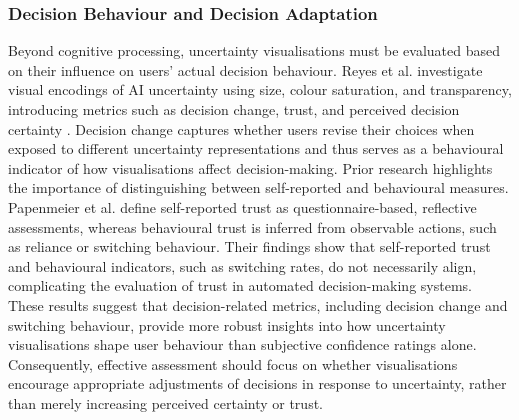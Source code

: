 \documentclass[final,journal,a4paper]{IEEEtran}
\begin{document}
\subsubsection{Decision Behaviour and Decision Adaptation}
Beyond cognitive processing, uncertainty visualisations must be evaluated based on their influence on users’ actual decision behaviour. Reyes et al. \cite{Reyes2025} investigate visual encodings of AI uncertainty using size, colour saturation, and transparency, introducing metrics such as decision change, trust, and perceived decision certainty \cite{Reyes2025}. Decision change captures whether users revise their choices when exposed to different uncertainty representations and thus serves as a behavioural indicator of how visualisations affect decision-making. Prior research highlights the importance of distinguishing between self-reported and behavioural measures. Papenmeier et al. \cite{Papenmeier2022} define self-reported trust as questionnaire-based, reflective assessments, whereas behavioural trust is inferred from observable actions, such as reliance or switching behaviour. Their findings show that self-reported trust and behavioural indicators, such as switching rates, do not necessarily align, complicating the evaluation of trust in automated decision-making systems.
\newline
These results suggest that decision-related metrics, including decision change and switching behaviour, provide more robust insights into how uncertainty visualisations shape user behaviour than subjective confidence ratings alone. Consequently, effective assessment should focus on whether visualisations encourage appropriate adjustments of decisions in response to uncertainty, rather than merely increasing perceived certainty or trust.
\end{document}
